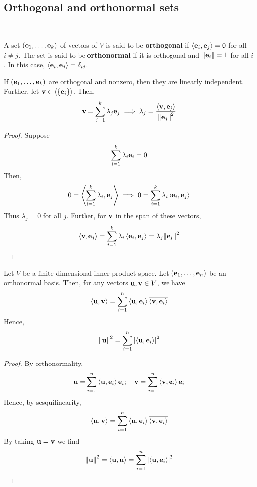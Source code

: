 \documentclass[a4paper,11pt]{article}
\begin{document}
\subsection{Orthogonal and orthonormal sets}
\ \vspace*{-1.5em}
\begin{definition}
	A set \( ({\bf e}_1, \dots, {\bf e}_k) \) of vectors of \( V \) is said to be \textbf{orthogonal} if \( \left\langle{{\bf e}_i, {\bf e}_j}\right\rangle = 0 \) for all \( i \neq j \).
	The set is said to be \textbf{orthonormal} if it is orthogonal and \( \norm{{\bf e}_i} = 1 \) for all \( i \).
	In this case, \( \left\langle{{\bf e}_i, {\bf e}_j}\right\rangle = \delta_{ij} \).
\end{definition}
\begin{lemma}
	If \( ({\bf e}_1, \dots, {\bf e}_k) \) are orthogonal and nonzero, then they are linearly independent.
	Further, let \( {\bf v} \in \left\langle{} \qty{{\bf e}_i} \right\rangle \).
	Then,
	\[
		{\bf v} = \sum_{j=1}^k \lambda_j {\bf e}_j \implies \lambda_j = \frac{\left\langle{{\bf v}, {\bf e}_j}\right\rangle}{\norm{{\bf e}_j}^2}
	\]
\end{lemma}
\begin{proof}
	Suppose
	\[
		\sum_{i=1}^k \lambda_i {\bf e}_i = 0
	\]
	Then,
	\[
		0 = \left\langle{\sum_{i=1}^k \lambda_i, {\bf e}_j}\right\rangle \implies 0 = \sum_{i=1}^k \lambda_i \left\langle{{\bf e}_i, {\bf e}_j}\right\rangle
	\]
	Thus \( \lambda_j = 0 \) for all \( j \).
	Further, for \( {\bf v} \) in the span of these vectors,
	\[
		\left\langle{{\bf v}, {\bf e}_j}\right\rangle = \sum_{i=1}^k \lambda_i \left\langle{{\bf e}_i, {\bf e}_j}\right\rangle = \lambda_j \norm{{\bf e}_j}^2 \qedhere
	\]
\end{proof}
\begin{corollary}
	Let \( V \) be a finite-dimensional inner product space.
	Let \( ({\bf e}_1, \dots, {\bf e}_n) \) be an orthonormal basis.
	Then, for any vectors \( {\bf u}, {\bf v} \in V \), we have
	\[
		\left\langle{{\bf u}, {\bf v}}\right\rangle = \sum_{i=1}^n \left\langle{{\bf u}, {\bf e}_i}\right\rangle \overline{\left\langle{{\bf v}, {\bf e}_i}\right\rangle}
	\]
	Hence,
	\[
		\norm{{\bf u}}^2 = \sum_{i=1}^n \abs{\left\langle{{\bf u},{\bf e}_i}\right\rangle}^2
	\]
\end{corollary}
\begin{proof}
	By orthonormality,
	\[
		{\bf u} = \sum_{i=1}^n \left\langle{{\bf u}, {\bf e}_i}\right\rangle {\bf e}_i;\quad {\bf v} = \sum_{i=1}^n \left\langle{{\bf v}, {\bf e}_i}\right\rangle {\bf e}_i
	\]
	Hence, by sesquilinearity,
	\[
		\left\langle{{\bf u},{\bf v}}\right\rangle = \sum_{i=1}^n \left\langle{{\bf u}, {\bf e}_i}\right\rangle \overline{\left\langle{{\bf v}, {\bf e}_i}\right\rangle}
	\]
	By taking \( {\bf u} = {\bf v} \) we find
	\[
		\norm{{\bf u}}^2 = \left\langle{{\bf u},{\bf u}}\right\rangle = \sum_{i=1}^n \abs{\left\langle{{\bf u},{\bf e}_i}\right\rangle}^2\qedhere
	\]
\end{proof}
\end{document}
